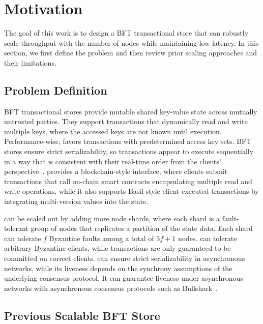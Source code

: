 \section{Motivation}
\label{sec:review}

The goal of this work is to design a BFT transactional store that can robustly scale throughput with the number of nodes while maintaining low latency.
In this section, we first define the problem and then review prior scaling approaches and their limitations.

\subsection{Problem Definition}

BFT transactional stores provide mutable shared key-value state across mutually untrusted parties.
They support transactions that dynamically read and write multiple keys, where the accessed keys are not known until execution.
Performance-wise, \sys favors transactions with predetermined access key sets.
BFT stores ensure strict serializability, so transactions appear to execute sequentially in a way that is consistent with their real-time order from the clients' perspective~\cite{linearizability}.
\sys provides a blockchain-style interface, where clients submit transactions that call on-chain smart contracts encapsulating multiple read and write operations, while it also supports Basil-style client-executed transactions by integrating multi-version values into the state.

\sys can be scaled out by adding more node shards, where each shard is a fault-tolerant group of nodes that replicates a partition of the state data.
Each shard can tolerate $f$ Byzantine faults among a total of $3f+1$ nodes.
\sys can tolerate arbitrary Byzantine clients, while transactions are only guaranteed to be committed on correct clients.
\sys can ensure strict serializability in asynchronous networks, while its liveness depends on the synchrony assumptions of the underlying consensus protocol.
It can guarantee liveness under asynchronous networks with asynchronous consensus protocols such as Bullshark~\cite{bullshark}.

\subsection{Previous Scalable BFT Store}

